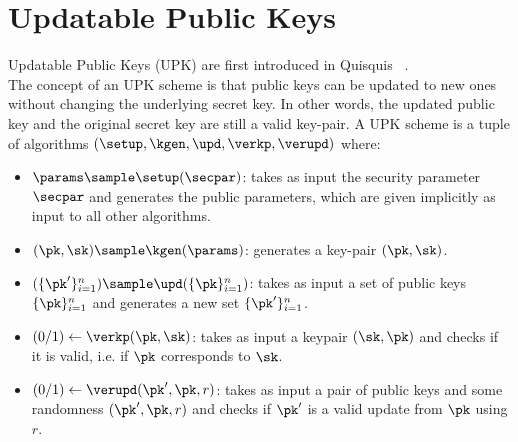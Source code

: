 \section{Updatable Public Keys} \label{UPK}

Updatable Public Keys (UPK) are first introduced in Quisquis ~\cite{fauzi2019quisquis}.\\
The concept of an UPK scheme is that public keys can be updated to new ones without changing the underlying secret key. 
In other words, the updated public key and the original secret key are still a valid key-pair.
A UPK scheme is a tuple of algorithms $(\setup, \kgen, \upd, \verkp, \verupd)$ where: 

\begin{itemize}
    \item $\params \sample \setup(\secpar)$: takes as input the security parameter $\secpar$ and generates the public parameters, which are given implicitly as input to all other algorithms. 
    \item $(\pk, \sk) \sample \kgen(\params)$: generates a key-pair $(\pk,\sk)$. 
    \item $(\{\pk'\}_{i=1}^n) \sample \upd(\{\pk\}_{i=1}^n)$: takes as input a set of public keys $\{\pk\}_{i=1}^n$ and generates a new set $\{\pk'\}_{i=1}^n$.
    \item $(0/1) \gets \verkp(\pk, \sk)$: takes as input a keypair $(\sk, \pk)$ and checks if it is valid, i.e. if $\pk$ corresponds to $\sk$.
    \item $(0/1) \gets \verupd(\pk', \pk, r)$: takes as input a pair of public keys and some randomness $(\pk', \pk, r)$ and checks if $\pk'$ is a valid update from $\pk$ using $r$.
\end{itemize}

